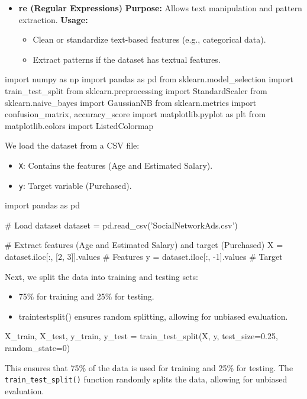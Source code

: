 \begin{itemize}
\item\textbf{ re (Regular Expressions)}
\textbf{Purpose:} Allows text manipulation and pattern extraction.
\textbf{Usage:}
\begin{itemize}
	\item Clean or standardize text-based features (e.g., categorical data).
	\item Extract patterns if the dataset has textual features.
\end{itemize}
\end{itemize}


\begin{python}
import numpy as np
import pandas as pd
from sklearn.model_selection import train_test_split
from sklearn.preprocessing import StandardScaler
from sklearn.naive_bayes import GaussianNB
from sklearn.metrics import confusion_matrix, accuracy_score
import matplotlib.pyplot as plt
from matplotlib.colors import ListedColormap
\end{python}



We load the dataset from a CSV file:
\begin{itemize}
	\item \texttt{X}: Contains the features (Age and Estimated Salary).
	\item \texttt{y}: Target variable (Purchased).
\end{itemize}
\begin{python}
	import pandas as pd
	
	# Load dataset
	dataset = pd.read_csv('SocialNetworkAds.csv')
	
	# Extract features (Age and Estimated Salary) and target (Purchased)
	X = dataset.iloc[:, [2, 3]].values  # Features
	y = dataset.iloc[:, -1].values  # Target
\end{python}



	
	Next, we split the data into training and testing sets:
	
	\begin{itemize}
	\item 75\% for training and 25\% for testing.
	\item traintestsplit() ensures random splitting, allowing for unbiased evaluation.
    \end{itemize}

	\begin{python}
X_train, X_test, y_train, y_test = train_test_split(X, y, test_size=0.25, random_state=0)
\end{python}
	This ensures that 75\% of the data is used for training and 25\% for testing. The \texttt{train\_test\_split()} function randomly splits the data, allowing for unbiased evaluation.
	

